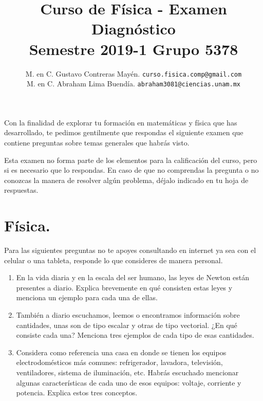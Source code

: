 \documentclass[12pt]{article}
\author{M. en C. Gustavo Contreras Mayén. \texttt{curso.fisica.comp@gmail.com}\\
    M. en C. Abraham Lima Buendía. \texttt{abraham3081@ciencias.unam.mx}}
\title{Curso de Física - Examen Diagnóstico\\{\large Semestre 2019-1 Grupo 5378}}
\date{ }
\begin{document}
\renewcommand\labelenumii{\theenumi.{\arabic{enumii}}}
\maketitle
\fontsize{14}{14}\selectfont
Con la finalidad de explorar tu formación en matemáticas y física que has desarrollado, te pedimos gentilmente  que respondas el siguiente examen que contiene preguntas sobre temas generales que habrás visto.

Esta examen no forma parte de los elementos para la calificación del curso, pero si es necesario que lo respondas. En caso de que no comprendas la pregunta o no conozcas la manera de resolver algún problema, déjalo indicado en tu hoja de respuestas.

\section{Física.}
Para las siguientes preguntas no te apoyes consultando en internet ya sea con el celular o una tableta, responde lo que consideres de manera personal.
\begin{enumerate}
\item En la vida diaria y en la escala del ser humano, las leyes de Newton están presentes a diario. Explica brevemente en qué consisten estas leyes y menciona un ejemplo para cada una de ellas.
\item También a diario escuchamos, leemos o encontramos información sobre cantidades, unas son de tipo escalar y otras de tipo vectorial. ¿En qué consiste cada una? Menciona tres ejemplos de cada tipo de esas cantidades.
\item Considera como referencia una casa en donde se tienen los equipos electrodomésticos más comunes: refrigerador, lavadora, televisión, ventiladores, sistema de iluminación, etc. Habrás escuchado mencionar algunas características de cada uno de esos equipos: voltaje, corriente y potencia. Explica estos tres conceptos.
\end{enumerate}
\end{document}
